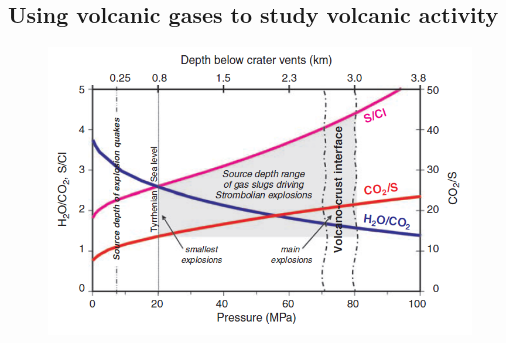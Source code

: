 \documentclass  [
  paper    = a4,
  BCOR     = 10mm,
  twoside,
  fontsize = 12pt,
  fleqn,
  toc      = bibnumbered,
  toc      = listofnumbered,
  numbers  = noendperiod,
  headings = normal,
  listof   = leveldown,
  version  = 3.03
]                                       {scrreprt}
\begin{document}
	\subsection{Using volcanic gases to study volcanic activity}
	\begin{figure}
		\centering
		\includegraphics[width=0.7\linewidth]{Zwischenbericht2018/Bilder/so2_bro}
		\caption{}
		\label{fig:so2bro}
	\end{figure}
	
\end{document}

